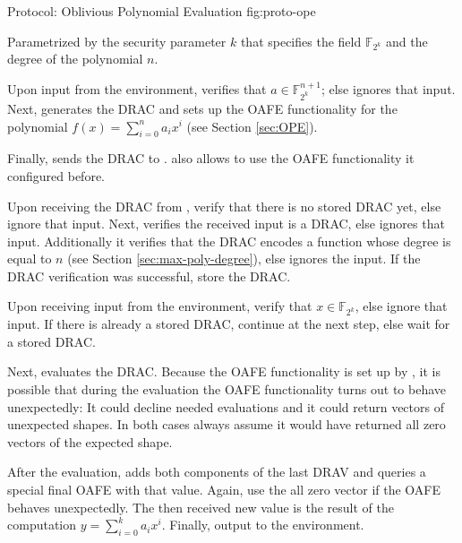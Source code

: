 \begin{JWprotocol}%
  {\JWprotoSymOPE}%
  {Protocol: Oblivious Polynomial Evaluation}%
  {fig:proto-ope}

  Parametrized by the security parameter $k$ that specifies the field
  $\mathbb{F}_{2^k}$ and the degree of the polynomial $n$.


  \begin{JWprotoSteps}

  \item Upon input  from the environment, \JWpOne{}
    verifies that $a \in \mathbb{F}_{2^k}^{n+1}$; else ignores that input. Next,
    \JWpOne{} generates the DRAC and sets up the OAFE functionality for the
    polynomial $f(x) = \sum_{i=0}^n a_ix^i$ (see Section \ref{sec:OPE}).

  \item Finally, \JWpOne{} sends the DRAC to \JWpTwo{}. \JWpOne{} also allows
    \JWpTwo{} to use the OAFE functionality it configured before.

  \end{JWprotoSteps}



  \begin{JWprotoSteps}

  \item Upon receiving the DRAC from \JWpOne{}, verify that there is no stored
    DRAC yet, else ignore that input. Next, \JWpTwo{} verifies the received
    input is a DRAC, else ignores that input. Additionally it verifies
    that the DRAC encodes a function whose degree is equal to $n$ (see
    Section \ref{sec:max-poly-degree}), else ignores the input. If the DRAC
    verification was successful, store the DRAC.

  \item Upon receiving input  from the environment,
    verify that $x \in \mathbb{F}_{2^k}$, else ignore that input. If there is
    already a stored DRAC, continue at the next step, else wait for a stored
    DRAC.

  \item Next, \JWpTwo{} evaluates the DRAC. Because the OAFE functionality is
    set up by \JWpOne{}, it is possible that during the evaluation the OAFE
    functionality turns out to behave unexpectedly: It could decline needed
    evaluations and it could return vectors of unexpected shapes. In both cases
    always assume it would have returned all zero vectors of the expected shape.

  \item After the evaluation, \JWpTwo{} adds both components of the last DRAV
    and queries a special final OAFE with that value. Again, use the all zero
    vector if the OAFE behaves unexpectedly. The then received new value is the
    result of the computation $y = \sum_{i=0}^k a_ix^i$. Finally, output
     to the environment.

  \end{JWprotoSteps}

\end{JWprotocol}

